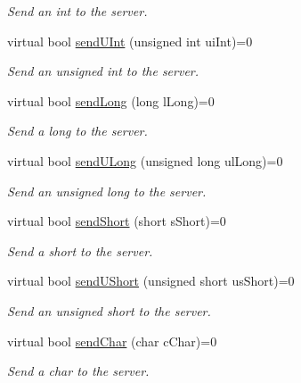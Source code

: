 \begin{DoxyCompactItemize}
\begin{DoxyCompactList}\small\item\em Send an int to the server. \end{DoxyCompactList}\item 
virtual bool \hyperlink{class_rad_jav_1_1_networking_1_1_tcpip_client_a5e7cc6633246e2772879271147e933ab}{send\+U\+Int} (unsigned int ui\+Int)=0
\begin{DoxyCompactList}\small\item\em Send an unsigned int to the server. \end{DoxyCompactList}\item 
virtual bool \hyperlink{class_rad_jav_1_1_networking_1_1_tcpip_client_a69679bab36c5d521232eb6d374ed0aa3}{send\+Long} (long l\+Long)=0
\begin{DoxyCompactList}\small\item\em Send a long to the server. \end{DoxyCompactList}\item 
virtual bool \hyperlink{class_rad_jav_1_1_networking_1_1_tcpip_client_a7a89c7236fb1002d656756df666c50a2}{send\+U\+Long} (unsigned long ul\+Long)=0
\begin{DoxyCompactList}\small\item\em Send an unsigned long to the server. \end{DoxyCompactList}\item 
virtual bool \hyperlink{class_rad_jav_1_1_networking_1_1_tcpip_client_a032c9ec922780d4ce6094459622c7b28}{send\+Short} (short s\+Short)=0
\begin{DoxyCompactList}\small\item\em Send a short to the server. \end{DoxyCompactList}\item 
virtual bool \hyperlink{class_rad_jav_1_1_networking_1_1_tcpip_client_a5f7307ef472e3eb46008cb3cb1a4004e}{send\+U\+Short} (unsigned short us\+Short)=0
\begin{DoxyCompactList}\small\item\em Send an unsigned short to the server. \end{DoxyCompactList}\item 
virtual bool \hyperlink{class_rad_jav_1_1_networking_1_1_tcpip_client_a65dc2eee02337f7b8c8aaa9e3e190a4d}{send\+Char} (char c\+Char)=0
\begin{DoxyCompactList}\small\item\em Send a char to the server. \end{DoxyCompactList}\item 

\end{DoxyCompactItemize}
